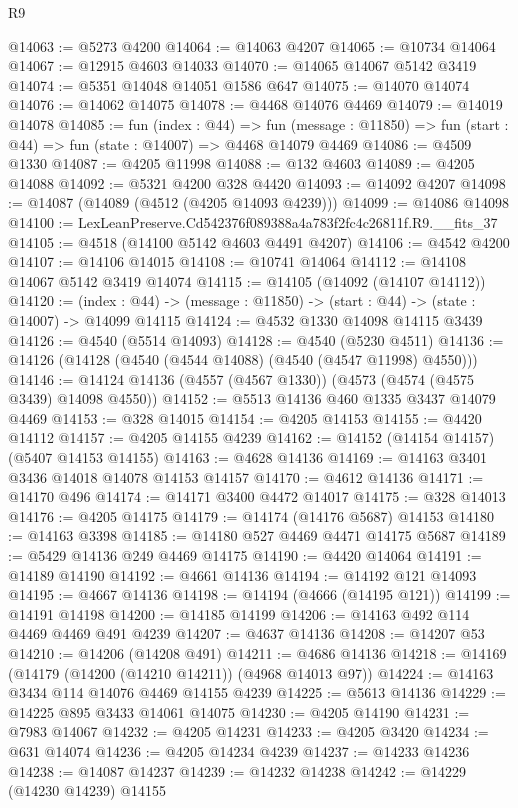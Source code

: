 \begin{lexlean}{R9}
\begin{coremodule}
@14063 := @5273 @4200
@14064 := @14063 @4207
@14065 := @10734 @14064
@14067 := @12915 @4603 @14033
@14070 := @14065 @14067 @5142 @3419
@14074 := @5351 @14048 @14051 @1586 @647
@14075 := @14070 @14074
@14076 := @14062 @14075
@14078 := @4468 @14076 @4469
@14079 := @14019 @14078
@14085 := fun (index : @44) =>
  fun (message : @11850) => fun (start : @44) => fun (state : @14007) => @4468 @14079 @4469
@14086 := @4509 @1330
@14087 := @4205 @11998
@14088 := @132 @4603
@14089 := @4205 @14088
@14092 := @5321 @4200 @328 @4420
@14093 := @14092 @4207
@14098 := @14087 (@14089 (@4512 (@4205 @14093 @4239)))
@14099 := @14086 @14098
@14100 := LexLeanPreserve.Cd542376f089388a4a783f2fc4c26811f.R9.__fits_37
@14105 := @4518 (@14100 @5142 @4603 @4491 @4207)
@14106 := @4542 @4200
@14107 := @14106 @14015
@14108 := @10741 @14064
@14112 := @14108 @14067 @5142 @3419 @14074
@14115 := @14105 (@14092 (@14107 @14112))
@14120 := (index : @44) -> (message : @11850) -> (start : @44) -> (state : @14007) -> @14099 @14115
@14124 := @4532 @1330 @14098 @14115 @3439
@14126 := @4540 (@5514 @14093)
@14128 := @4540 (@5230 @4511)
@14136 := @14126 (@14128 (@4540 (@4544 @14088) (@4540 (@4547 @11998) @4550)))
@14146 := @14124 @14136 (@4557 (@4567 @1330)) (@4573 (@4574 (@4575 @3439) @14098 @4550))
@14152 := @5513 @14136 @460 @1335 @3437 @14079 @4469
@14153 := @328 @14015
@14154 := @4205 @14153
@14155 := @4420 @14112
@14157 := @4205 @14155 @4239
@14162 := @14152 (@14154 @14157) (@5407 @14153 @14155)
@14163 := @4628 @14136
@14169 := @14163 @3401 @3436 @14018 @14078 @14153 @14157
@14170 := @4612 @14136
@14171 := @14170 @496
@14174 := @14171 @3400 @4472 @14017
@14175 := @328 @14013
@14176 := @4205 @14175
@14179 := @14174 (@14176 @5687) @14153
@14180 := @14163 @3398
@14185 := @14180 @527 @4469 @4471 @14175 @5687
@14189 := @5429 @14136 @249 @4469 @14175
@14190 := @4420 @14064
@14191 := @14189 @14190
@14192 := @4661 @14136
@14194 := @14192 @121 @14093
@14195 := @4667 @14136
@14198 := @14194 (@4666 (@14195 @121))
@14199 := @14191 @14198
@14200 := @14185 @14199
@14206 := @14163 @492 @114 @4469 @4469 @491 @4239
@14207 := @4637 @14136
@14208 := @14207 @53
@14210 := @14206 (@14208 @491)
@14211 := @4686 @14136
@14218 := @14169 (@14179 (@14200 (@14210 @14211)) (@4968 @14013 @97))
@14224 := @14163 @3434 @114 @14076 @4469 @14155 @4239
@14225 := @5613 @14136
@14229 := @14225 @895 @3433 @14061 @14075
@14230 := @4205 @14190
@14231 := @7983 @14067
@14232 := @4205 @14231
@14233 := @4205 @3420
@14234 := @631 @14074
@14236 := @4205 @14234 @4239
@14237 := @14233 @14236
@14238 := @14087 @14237
@14239 := @14232 @14238
@14242 := @14229 (@14230 @14239) @14155

\end{coremodule}
\end{lexlean}
